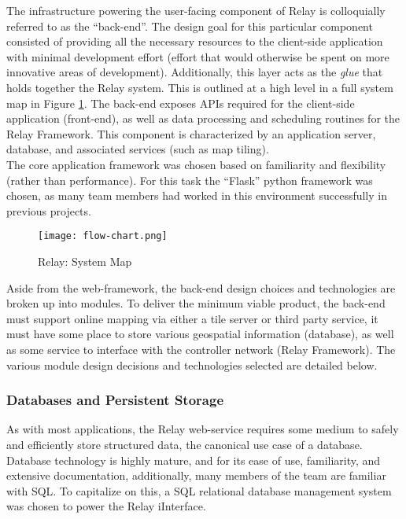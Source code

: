 \documentclass{article}
\begin{document}
The infrastructure powering the user-facing component of Relay is colloquially referred to as the ``back-end''.
The design goal for this particular component consisted of providing all the necessary resources to the client-side application with minimal development effort (effort that would otherwise be spent on more innovative areas of development).
Additionally, this layer acts as the \emph{glue} that holds together the Relay system.
This is outlined at a high level in a full system map in Figure \ref{fig:Back_end_system_map}.
The back-end exposes APIs required for the client-side application (front-end), as well as data processing and scheduling routines for the Relay Framework.
This component is characterized by an application server, database, and associated services (such as map tiling).\\

The core application framework was chosen based on familiarity and flexibility (rather than performance).
For this task the ``Flask'' python framework was chosen, as many team members had worked in this environment successfully in previous projects.\\

\begin{figure}[htbp!]
  \begin{centering}
    \texttt{[image: flow-chart.png]}
    \caption{Relay: System Map}
    \label{fig:Back_end_system_map}
  \end{centering}
\end{figure}

Aside from the web-framework, the back-end design choices and technologies are broken up into modules.
To deliver the minimum viable product, the back-end must support online mapping via either a tile server or third party service, it must have some place to store various geospatial information (database), as well as some service to interface with the controller network (Relay Framework).
The various module design decisions and technologies selected are detailed below.\\

\subsubsection{Databases and Persistent Storage}

As with most applications, the Relay web-service requires some medium to safely and efficiently store structured data, the canonical use case of a database.
Database technology is highly mature, and for its ease of use, familiarity, and extensive documentation, additionally, many members of the team are familiar with SQL.
To capitalize on this, a SQL relational database management system was chosen to power the Relay iInterface.\\
\end{document}
